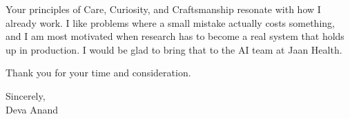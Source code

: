 \documentclass[letterpaper,11pt]{article}
\begin{document}
Your principles of Care, Curiosity, and Craftsmanship resonate with how I already work. I like problems where a small mistake actually costs something, and I am most motivated when research has to become a real system that holds up in production. I would be glad to bring that to the AI team at Jaan Health.

Thank you for your time and consideration.

\vspace{6pt}

Sincerely, \\
Deva Anand
\end{document}

